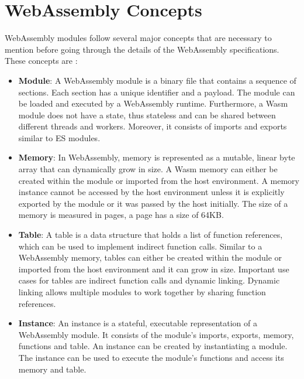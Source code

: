 \section{WebAssembly Concepts}
\label{sec:wasm-concepts}

WebAssembly modules follow several major concepts that are necessary to mention before going through the details of the WebAssembly specifications. These concepts are \cite{mozillacorporation_2023_webassembly}:

\begin{itemize}
  \item \textbf{Module}: A WebAssembly module is a binary file that contains a sequence of sections. Each section has a unique identifier and a payload. The module can be loaded and executed by a WebAssembly runtime. Furthermore, a Wasm module does not have a state, thus stateless and can be shared between different threads and workers. Moreover, it consists of imports and exports similar to ES modules.
  \item \textbf{Memory}: In WebAssembly, memory is represented as a mutable, linear byte array that can dynamically grow in size. A Wasm memory can either be created within the module or imported from the host environment. A memory instance cannot be accessed by the host environment unless it is explicitly exported by the module or it was passed by the host initially. The size of a memory is measured in pages, a page has a size of 64KB. 
  \item \textbf{Table}: A table is a data structure that holds a list of function references, which can be used to implement indirect function calls. Similar to a WebAssembly memory, tables can either be created within the module or imported from the host environment and it can grow in size. Important use cases for tables are indirect function calls and dynamic linking. Dynamic linking allows multiple modules to work together by sharing function references.
  \item \textbf{Instance}: An instance is a stateful, executable representation of a WebAssembly module. It consists of the module's imports, exports, memory, functions and table. An instance can be created by instantiating a module. The instance can be used to execute the module's functions and access its memory and table. 
\end{itemize}

